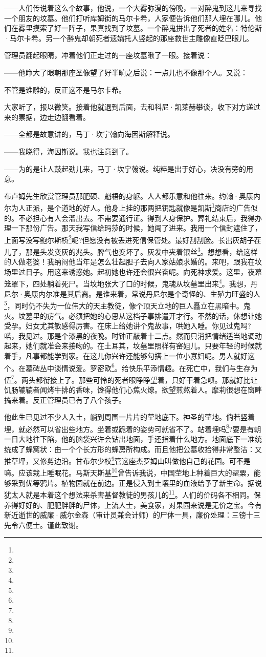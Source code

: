 \par ——人们传说着这么个故事，他说，一个大雾弥漫的傍晚，一对醉鬼到这儿来寻找一个朋友的坟墓。他们打听库姆街的马尔卡希，人家便告诉他们那人埋在哪儿。他们在雾里摸索了好一阵子，果真找到了坟墓。一个醉鬼拼出了死者的姓名：特伦斯·马尔卡希。另一个醉鬼却朝死者遗孀托人竖起的那座救世主雕像直眨巴眼儿。
\par 管理员翻起眼睛，冲着他们正走过的一座坟墓瞅了一眼。接着说：
\par ——他睁大了眼朝那座圣像望了好半晌之后说：一点儿也不像那个人。又说：
\par 不管是谁雕的，反正这不是马尔卡希。
\par 大家听了，报以微笑。接着他就退到后面，去和科尼·凯莱赫攀谈，收下对方递过来的票据，边走边翻看着。
\par ——全都是故意讲的，马丁·坎宁翰向海因斯解释说。
\par ——我晓得，海因斯说。我也注意到了。
\par ——为的是让人鼓起劲儿来，马丁·坎宁翰说。纯粹是出于好心，决没有旁的用意。
\par 布卢姆先生欣赏管理员那肥硕、魁梧的身躯。人人都乐意和他往来。约翰·奥康内尔为人正派，是个道地的好人。他身上挂的那两把钥匙就像是凯斯\footnote{}商店的广告似的。不必担心有人会溜出去。不需要通行证。得到人身保护。葬礼结束后，我得办理一下那份广告。那天我写信给玛莎的时候，她闯了进来。我用一个信封遮住了，上面写没写鲍尔斯桥\footnote{}呢?但愿没有被丢进死信保管处。最好刮刮脸。长出灰胡子茬儿了，那是头发变灰的兆头。脾气也变坏了。灰发中夹着银丝\footnote{}。想想看，给这样的人做老婆！我纳闷他当年是怎么壮起胆子去向人家姑娘求婚的。来吧，跟我在坟场里过日子。用这来诱惑她。起初她也许还会很兴奋呢。向死神求爱。这里，夜幕笼罩下，四处躺着死尸。当坟地张大了口的时候，鬼魂从坟墓里出来\footnote{}。我想，丹尼尔·奥康内尔准是其后裔。是谁来着，常说丹尼尔是个奇怪的、生殖力旺盛的人\footnote{}，同时仍不失为一位伟大的天主教徒，像个顶天立地的巨人矗立在黑暗中。鬼火。坟墓里的疠气。必须把她的心思从这档子事排遣开才行。不然的话，休想让她受孕。妇女尤其敏感得厉害。在床上给她讲个鬼故事，哄她入睡。你见过鬼吗?喏，我见过。那是个漆黑的夜晚。时钟正敲着十二点。然而只消把情绪适当地调动起来，她们就准会来接吻的。在土耳其，坟墓里照样有窑姐儿。只要年轻的时候就着手，凡事都能学到家。在这儿你兴许还能够勾搭上一位小寡妇呢。男人就好这个。在墓碑丛中谈情说爱。罗密欧\footnote{}。给快乐平添情趣。在死亡中，我们与生存为伍\footnote{}。两头都衔接上了。那些可怜的死者眼睁睁望着，只好干着急呗。那就好比让饥肠辘辘者闻烤牛排的香味，馋得他们心焦火燎。欲望煎熬着人。摩莉很想在窗畔搞来着。反正管理员已有了八个孩子。
\par 他此生已见过不少人入土，躺到周围一片片的茔地底下。神圣的茔地。倘若竖着埋，就必然可以省出些地方。坐着或跪着的姿势可就省不了。站着埋吗\footnote{}?要是有朝一日大地往下陷，他的脑袋兴许会钻出地面，手还指着什么地方。地面底下一准统统成了蜂窝状：由一个个长方形的蜂房所构成。而且他把公墓收拾得非常整洁：又推草坪，又修剪边沿。甘布尔少校\footnote{}管这座杰罗姆山叫做他自己的花园。可不是嘛。应该栽上睡眠花。马斯天斯基\footnote{}曾告诉我说，中国茔地上种着巨大的罂粟，能够采到优等鸦片。植物园就在前边。正是侵入到土壤里的血液给予了新生命。据说犹太人就是本着这个想法来杀害基督教徒的男孩儿的\footnote{}。人们的价码各不相同。保养得好好的、肥肥胖胖的尸体，上流人士，美食家，对果园来说是无价之宝。今有新近逝世的威廉·威尔金森（审计员兼会计师）的尸体一具，廉价处理：三镑十三先令六便士。谨此致谢。
